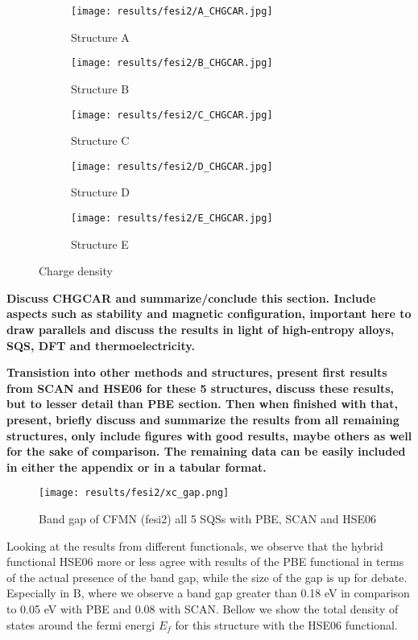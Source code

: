 \begin{figure}
	\begin{subfigure}{0.5\textwidth}
		\texttt{[image: results/fesi2/A\_CHGCAR.jpg]}
		\caption{Structure A}
	\end{subfigure}
	\hfill
	\begin{subfigure}{0.5\textwidth}
		\texttt{[image: results/fesi2/B\_CHGCAR.jpg]}
		\caption{Structure B}
	\end{subfigure}
	\begin{subfigure}{0.5\textwidth}
		\texttt{[image: results/fesi2/C\_CHGCAR.jpg]}
		\caption{Structure C}
	\end{subfigure}
	\hfill
	\begin{subfigure}{0.5\textwidth}
		\texttt{[image: results/fesi2/D\_CHGCAR.jpg]}
		\caption{Structure D}
	\end{subfigure}
	\begin{subfigure}{0.5\textwidth}
		\texttt{[image: results/fesi2/E\_CHGCAR.jpg]}
		\caption{Structure E}
	\end{subfigure}
		\caption{Charge density}
		\label{chgcar}
\end{figure}



\textbf{Discuss CHGCAR and summarize/conclude this section. Include aspects such as stability and magnetic configuration, important here to draw parallels and discuss the results in light of high-entropy alloys, SQS, DFT and thermoelectricity. }

\textbf{Transistion into other methods and structures, present first results from SCAN and HSE06 for these 5 structures, discuss these results, but to lesser detail than PBE section. Then when finished with that, present, briefly discuss and summarize the results from all remaining structures, only include figures with good results, maybe others as well for the sake of comparison. The remaining data can be easily included in either the appendix or in a tabular format. }

\begin{figure}[H]
\centering
\texttt{[image: results/fesi2/xc\_gap.png]}
\caption{Band gap of CFMN (fesi2) all 5 SQSs with PBE, SCAN and HSE06}
\label{Xc_fig}
\end{figure}


Looking at the results from different functionals, we observe that the hybrid functional HSE06 more or less agree with results of the PBE functional in terms of the actual presence of the band gap, while the size of the gap is up for debate. Especially in B, where we observe a band gap greater than 0.18 eV in comparison to 0.05 eV with PBE and 0.08 with SCAN. Bellow we show the total density of states around the fermi energi $E_f$ for this structure with the HSE06 functional. 

